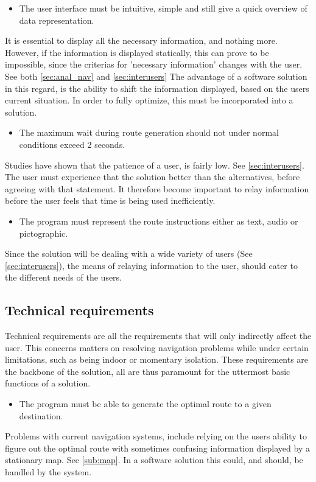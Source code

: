 \begin{itemize}
	\item The user interface must be intuitive, simple and still give a quick overview of data representation.
\end{itemize}
It is essential to display all the necessary information, and nothing more. However, if the information is displayed statically, this can prove to be impossible, since the criterias for 'necessary information' changes with the user. See both \cref{sec:anal_nav} and \cref{sec:interusers} The advantage of a software solution in this regard, is the ability to shift the information displayed, based on the users current situation. In order to fully optimize, this must be incorporated into a solution.

\begin{itemize}
	\item The maximum wait during route generation should not under normal conditions exceed 2 seconds.\label{irm_tid}
\end{itemize}
Studies have shown that the patience of a user, is fairly low. See \cref{sec:interusers}. The user must experience that the solution better than the alternatives, before agreeing with that statement. It therefore become important to relay information before the user feels that time is being used inefficiently.

\begin{itemize}
	\item The program must represent the route instructions either as text, audio or pictographic.
\end{itemize}
Since the solution will be dealing with a wide variety of users (See \cref{sec:interusers}), the means of relaying information to the user, should cater to the different needs of the users.


\subsection{Technical requirements}

Technical requirements are all the requirements that will only indirectly affect the user. This concerns matters on resolving navigation problems while under certain limitations, such as being indoor or momentary isolation. These requirements are the backbone of the solution, all are thus paramount for the uttermost basic functions of a solution.

\begin{itemize}
	\item The program must be able to generate the optimal route to a given destination.
\end{itemize}
Problems with current navigation systems, include relying on the users ability to figure out the optimal route with sometimes confusing information displayed by a stationary map. See \cref{sub:map}. In a software solution this could, and should, be handled by the system.

